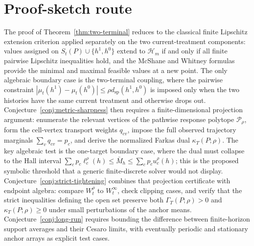 \documentclass[11pt]{article}
\newcommand{\calH}{\mathcal{H}}
\theoremstyle{definition}
\theoremstyle{plain}
\theoremstyle{remark}
\begin{document}
\section{Proof-sketch route}
The proof of Theorem~\ref{thm:two-terminal} reduces to the classical finite Lipschitz extension criterion applied separately on the two current-treatment components: values assigned on \(S_t(P)\cup\{h^1,h^0\}\) extend to \(\calH_m\) if and only if all finite pairwise Lipschitz inequalities hold, and the McShane and Whitney formulas provide the minimal and maximal feasible values at a new point.  The only algebraic boundary case is the two-terminal coupling, where the pairwise constraint \(|\mu_t(h^1)-\mu_t(h^0)|\le\rho d_{\mathrm{sp}}(h^1,h^0)\) is imposed only when the two histories have the same current treatment and otherwise drops out.  Conjecture~\ref{conj:metric-sharpness} then requires a finite-dimensional projection argument: enumerate the relevant vertices of the pathwise response polytope \(\mathcal P_\rho\), form the cell-vertex transport weights \(q_{cv}\), impose the full observed trajectory marginals \(\sum_v q_{cv}=p_c\), and derive the normalized Farkas dual \(\kappa_T(P;\rho)\).  The key algebraic test is the one-target boundary case, where the dual must collapse to the Hall interval \(\sum_c p_c\ell_c^\rho(h)\le \bar M_h\le\sum_c p_cu_c^\rho(h)\); this is the proposed symbolic threshold that a generic finite-discrete solver would not display.  Conjecture~\ref{conj:strict-tightening} combines that projection certificate with endpoint algebra: compare \(W_t^\rho\) to \(W_t^\infty\), check clipping cases, and verify that the strict inequalities defining the open set preserve both \(\Gamma_T(P;\rho)>0\) and \(\kappa_T(P;\rho)\ge0\) under small perturbations of the anchor means.  Conjecture~\ref{conj:long-run} requires bounding the difference between finite-horizon support averages and their Cesaro limits, with eventually periodic and stationary anchor arrays as explicit test cases.
\end{document}

